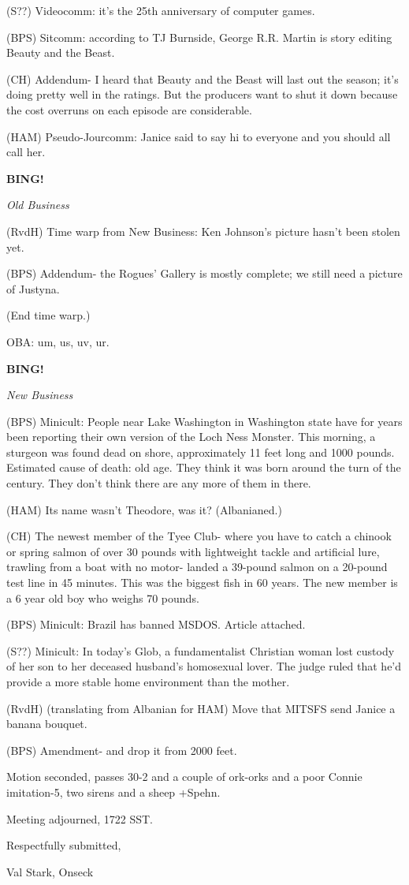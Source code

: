 \documentclass[12pt]{article}
\newcommand{\bing}{{\bf BING!} }
\newcommand{\goto}[1]{\bing \vskip 12pt \centerline{{\em{#1}}}}
\begin{document}
(S??) Videocomm: it's the 25th anniversary of computer games.

(BPS) Sitcomm: according to TJ Burnside, George R.R. Martin is story editing Beauty and the Beast.

(CH) Addendum- I heard that Beauty and the Beast will last out the season; it's doing pretty well in the ratings. But the producers want to shut it down because the cost overruns on each episode are considerable.

(HAM) Pseudo-Jourcomm: Janice said to say hi to everyone and you should all call her.

\goto{Old Business}

(RvdH) Time warp from New Business: Ken Johnson's picture hasn't been stolen yet.

(BPS) Addendum- the Rogues' Gallery is mostly complete; we still need a picture of Justyna.

(End time warp.)

OBA: um, us, uv, ur.

\goto{New Business}

(BPS) Minicult: People near Lake Washington in Washington state have for years been reporting their own version of the Loch Ness Monster. This morning, a sturgeon was found dead on shore, approximately 11 feet long and 1000 pounds. Estimated cause of death: old age. They think it was born around the turn of the century. They don't think there are any more of them in there.

(HAM) Its name wasn't Theodore, was it? (Albanianed.)

(CH) The newest member of the Tyee Club- where you have to catch a chinook or spring salmon of over 30 pounds with lightweight tackle and artificial lure, trawling from a boat with no motor- landed a 39-pound salmon on a 20-pound test line in 45 minutes. This was the biggest fish in 60 years. The new member is a 6 year old boy who weighs 70 pounds.

(BPS) Minicult: Brazil has banned MSDOS. Article attached.

(S??) Minicult: In today's Glob, a fundamentalist Christian woman lost custody of her son to her deceased husband's homosexual lover. The judge ruled that he'd provide a more stable home environment than the mother.

(RvdH) (translating from Albanian for HAM) Move that MITSFS send Janice a banana bouquet.

(BPS) Amendment- and drop it from 2000 feet.

Motion seconded, passes 30-2 and a couple of ork-orks and a poor Connie imitation-5, two sirens and a sheep +Spehn.

\vspace{12pt}

\noindent
Meeting adjourned, 1722 SST.

\vspace{18pt}

\centerline{Respectfully submitted,}
\centerline{Val Stark, Onseck}
\end{document}
